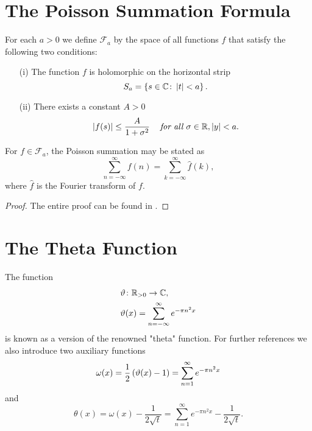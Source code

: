 \section{The Poisson Summation Formula}


\begin{definition}
	For each $a > 0$ we define $\mathcal{F}_a$ by the space of all functions $f$ that satisfy the following two conditions:
\begin{enumerate}
	\item[(i)] The function $f$ is holomorphic on the horizontal strip
		\begin{equation*}
			S_a = \left\{s \in \mathbb{C} \colon \left|t\right| < a\right\}.
		\end{equation*}
	\item[(ii)] There exists a constant $A > 0$
		\begin{equation*}
			\left|f(s)\right| \leq \frac{A}{1 + \sigma^2} \hspace{0.3cm} \textit{ for all } \sigma \in \mathbb{R}, \left|y\right| < a.
		\end{equation*}
\end{enumerate}
\end{definition}


\begin{theorem}
	For $f \in \mathcal{F}_a$, the Poisson summation may be stated as
\begin{equation*}
	\sum _{n = -\infty} ^\infty f(n) = \sum _{k = -\infty} ^\infty \hat{f}(k),
\end{equation*}
	where $\hat{f}$ is the Fourier transform of $f$.
\end{theorem}
\begin{proof}
	The entire proof can be found in \cite{Stein2003}.
\end{proof}


\section{The Theta Function}


\begin{definition}
	The function
\begin{equation*}
\begin{aligned}
	&\vartheta \colon \mathbb{R}_{> 0} \to \mathbb{C}, \\
	&\vartheta(x) = \sum _{n = -\infty} ^{\infty} e^{-\pi n^2 x}
\end{aligned}
\end{equation*}
	is known as a version of the renowned "theta" function. For further references we also introduce two auxiliary functions
\begin{equation*}
	\omega(x) = \frac{1}{2}\left(\vartheta(x) - 1\right) = \sum _{n = 1} ^{\infty} e^{-\pi n^2 x}
\end{equation*}
	and
\begin{equation*}
	\theta(x) = \omega(x) - \frac{1}{2 \sqrt{t}} = \sum _{n = 1} ^{\infty} e^{-\pi n^2 x} - \frac{1}{2 \sqrt{t}}.
\end{equation*}
\end{definition}


